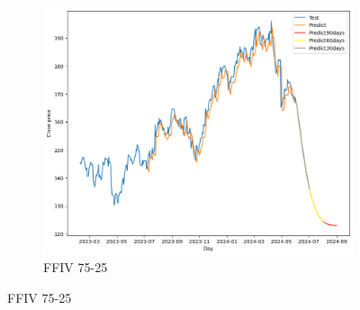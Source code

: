 \documentclass{ieeeojies}
\begin{document}
\begin{figure}[H]
    \hfill
    \begin{subfigure}[b]{0.33\linewidth}
        \centering
        \includegraphics[width=\linewidth]{LSTM Plot/FFIV_LSTM_75_25.png}
        \caption{FFIV 75-25}
        \label{fig:ffiv-75-25}
    \end{subfigure}
    \vspace{10pt}
\end{figure}
\end{document}
